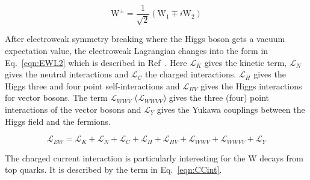 \begin{equation}
\label{eqn:Wpm}
\textrm{W}^{\pm}=\frac{1}{\sqrt{2}}\left(\textrm{W}_{1}\mp i\textrm{W}_{2}\right)
\end{equation}





After electroweak symmetry breaking where the Higgs boson gets a vacuum expectation value, the electroweak Lagrangian changes into the form in Eq.~\ref{eqn:EWL2} which is described in Ref~\cite{Pich:2005mk}. Here $\mathcal{L}_{K}$ gives the kinetic term, $\mathcal{L}_{N}$ gives the neutral interactions and $\mathcal{L}_{C}$ the charged interactions. $\mathcal{L}_{H}$ gives the Higgs three and four point self-interactions and $\mathcal{L}_{HV}$ gives the Higgs interactions for vector bosons. The term $\mathcal{L}_{WWV}$ ($\mathcal{L}_{WWVV}$) gives the three (four) point interactions of the vector bosons and $\mathcal{L}_{Y}$ gives the Yukawa couplings between the Higgs field and the fermions.

\begin{equation}
\label{eqn:EWL2}
\mathcal{L}_{EW} = \mathcal{L}_{K} + \mathcal{L}_{N} + \mathcal{L}_{C} + \mathcal{L}_{H} + \mathcal{L}_{HV} + \mathcal{L}_{WWV} + \mathcal{L}_{WWVV} + \mathcal{L}_{Y}
\end{equation}

The charged current interaction is particularly interesting for the W decays from top quarks. It is described by the term in Eq.~\ref{eqn:CCint}. 

